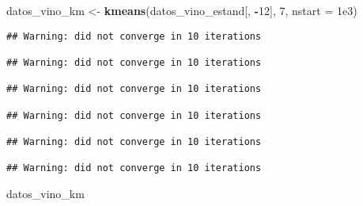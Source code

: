 \documentclass[
]{article}
\newenvironment{Shaded}{\begin{snugshade}}{\end{snugshade}}
\newcommand{\AttributeTok}[1]{\textcolor[rgb]{0.13,0.29,0.53}{#1}}
\newcommand{\DecValTok}[1]{\textcolor[rgb]{0.00,0.00,0.81}{#1}}
\newcommand{\FloatTok}[1]{\textcolor[rgb]{0.00,0.00,0.81}{#1}}
\newcommand{\FunctionTok}[1]{\textcolor[rgb]{0.13,0.29,0.53}{\textbf{#1}}}
\newcommand{\NormalTok}[1]{#1}
\newcommand{\OtherTok}[1]{\textcolor[rgb]{0.56,0.35,0.01}{#1}}
\newcommand{\SpecialCharTok}[1]{\textcolor[rgb]{0.81,0.36,0.00}{\textbf{#1}}}
\begin{document}
\begin{Shaded}
\begin{Highlighting}[]
\NormalTok{datos\_vino\_km }\OtherTok{\textless{}{-}} \FunctionTok{kmeans}\NormalTok{(datos\_vino\_estand[, }\SpecialCharTok{{-}}\DecValTok{12}\NormalTok{], }\DecValTok{7}\NormalTok{, }\AttributeTok{nstart =} \FloatTok{1e3}\NormalTok{)}
\end{Highlighting}
\end{Shaded}

\begin{verbatim}
## Warning: did not converge in 10 iterations

## Warning: did not converge in 10 iterations

## Warning: did not converge in 10 iterations

## Warning: did not converge in 10 iterations

## Warning: did not converge in 10 iterations

## Warning: did not converge in 10 iterations
\end{verbatim}

\begin{Shaded}
\begin{Highlighting}[]
\NormalTok{datos\_vino\_km}
\end{Highlighting}
\end{Shaded}
\end{document}
